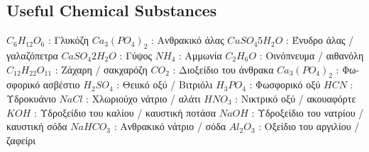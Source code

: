 \documentclass[12pt]{article}
\begin{document}
\begin{flushleft}
	\subsection{Useful Chemical Substances}

	\textbullet \quad $\displaystyle C_6H_{12}O_6 $  :  \textgreek{Γλυκόζη} \linebreak 
	\textbullet \quad $\displaystyle Ca_3 (PO_4)_2 $  :  \textgreek{Ανθρακικό άλας} \linebreak 
	\textbullet \quad $\displaystyle CuSO_4 5H_2O $  :  \textgreek{Ένυδρο άλας / γαλαζόπετρα} \linebreak 
	\textbullet \quad $\displaystyle CaSO_4 2H_2O $  :  \textgreek{Γύψος} \linebreak 
	\textbullet \quad $\displaystyle NH_4$  :  \textgreek{Αμμωνία} \linebreak 
	\textbullet \quad $\displaystyle C_2H_6O$  :  \textgreek{Οινόπνευμα / αιθανόλη} \linebreak 
	\textbullet \quad $\displaystyle C_{12}H_{22}O_{11}$  :  \textgreek{Ζάχαρη / σακχαρόζη} \linebreak 
	\textbullet \quad $\displaystyle CO_2$  :  \textgreek{Διοξείδιο του άνθρακα} \linebreak 
	\textbullet \quad $\displaystyle Ca_3 (PO_4)_2 $  :  \textgreek{Φωσφορικό ασβέστιο} \linebreak 
	\textbullet \quad $\displaystyle H_2 SO_4$  :  \textgreek{Θειικό οξύ / Βιτριόλι} \linebreak 
	\textbullet \quad $\displaystyle H_3PO_4$  :  \textgreek{Φωσφορικό οξύ} \linebreak 
	\textbullet \quad $\displaystyle HCN $  :  \textgreek{Υδροκυάνιο} \linebreak 
	\textbullet \quad $\displaystyle NaCl$  :  \textgreek{Χλωριούχο νάτριο / αλάτι} \linebreak 
	\textbullet \quad $\displaystyle HNO_3$  :  \textgreek{Νικτρικό οξύ / ακουαφόρτε} \linebreak 
	\textbullet \quad $\displaystyle KOH$  :  \textgreek{Υδροξείδιο του καλίου / καυστική ποτάσα} \linebreak 
	\textbullet \quad $\displaystyle NaOH$  :  \textgreek{Υδροξείδιο του νατρίου / καυστική σόδα} \linebreak 
	\textbullet \quad $\displaystyle NaHCO_3$  :  \textgreek{Ανθρακικό νάτριο / σόδα} \linebreak 
	\textbullet \quad $\displaystyle Al_2O_3$  :  \textgreek{Οξείδιο του αργιλίου / ζαφείρι} \linebreak 

\end{flushleft}
\end{document}
